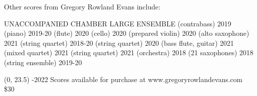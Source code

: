 \documentclass[11pt]{article}
\begin{document}

\begin{center}
\fontsize{.6cm}{1em}\selectfont Other scores from Gregory Rowland Evans include: \hfill
\end{center}
\vspace*{4\baselineskip}
{
\begin{center}
\setlength{\columnseprule}{1pt}
\setlength{\columnsep}{6em}

\begin{paracol}{3}
\fontsize{.3cm}{1em}\selectfont UNACCOMPANIED
\switchcolumn[1]
\fontsize{.3cm}{1em}\selectfont CHAMBER
\switchcolumn[2]
\fontsize{.3cm}{1em}\selectfont LARGE ENSEMBLE
\switchcolumn[0]
\fontsize{.1cm}{0.5em}  (contrabass) 2019
\switchcolumn[0]
\fontsize{.1cm}{0.5em}  (piano) 2019-20
\switchcolumn[0]
\fontsize{.1cm}{0.5em}  (flute) 2020
\switchcolumn[0]
\fontsize{.1cm}{0.5em}  (cello) 2020
\switchcolumn[0]
\fontsize{.1cm}{0.5em}  (prepared violin) 2020
\switchcolumn[0]
\fontsize{.1cm}{0.5em}  (alto saxophone) 2021
\switchcolumn[1]
\fontsize{.1cm}{0.5em}  (string quartet) 2018-20
\switchcolumn[1]
\fontsize{.1cm}{0.5em}  (string quartet) 2020
\switchcolumn[1]
\fontsize{.1cm}{0.5em}  (bass flute, guitar) 2021
\switchcolumn[1]
\fontsize{.1cm}{0.5em}  (mixed quartet) 2021
\switchcolumn[1]
\fontsize{.1cm}{0.5em}  (string quartet) 2021
\switchcolumn[2]
\fontsize{.1cm}{0.5em}  (orchestra) 2018
\switchcolumn[2]
\fontsize{.1cm}{0.5em}  (21 saxophones) 2018
\switchcolumn[2]
\fontsize{.1cm}{0.5em}  (string ensemble) 2019-20


\end{paracol}
\end{center}
}

\begin{textblock}{23}(0, 23.5)
-2022 \hfill
Scores available for purchase at www.gregoryrowlandevans.com \hfill
\$30
\end{textblock}
\end{document}
